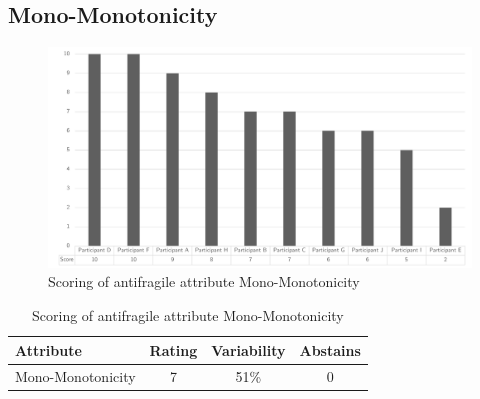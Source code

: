 \subsection{Mono-Monotonicity}
\begin{figure}[h!]
	\centering
	\includegraphics[width=0.9\linewidth]{images/scoreafmonomonotonicity}
	\caption[Scoring of antifragile attribute Mono-Monotonicity]{Scoring of antifragile attribute Mono-Monotonicity}
	\label{fig:appscoringafmonomonotonicity}
\end{figure}
\begin{table}[h!]
	\centering
	\begin{tabular}{p{}ccc}
		\toprule
		\textbf{Attribute} & \textbf{Rating} & \textbf{Variability} & \textbf{Abstains} \\
		\midrule
		Mono-Monotonicity & 7 & 51\% & 0 \\%
		\bottomrule
	\end{tabular}%
	\caption[Scoring of antifragile attribute Mono-Monotonicity]{Scoring of antifragile attribute Mono-Monotonicity}
	\label{tab:appscoringafmonomonotonicity}%
\end{table}%
\newpage
